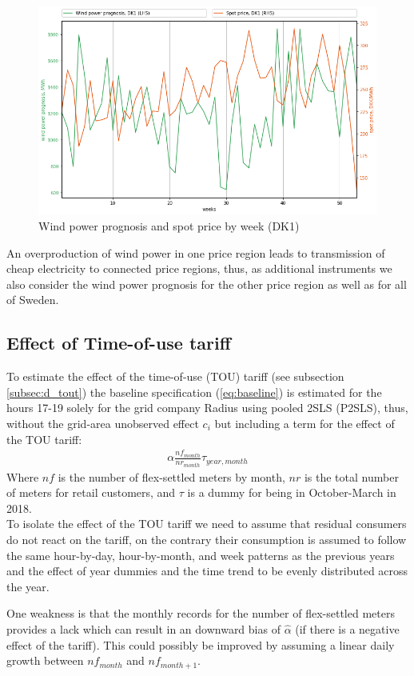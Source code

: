 \begin{figure}[H]
  \centering
  \caption{Wind power prognosis and spot price by week (DK1)}
  \label{fig:wp_price_dk1_week}
    \includegraphics[width=1 \textwidth]{03_figures/wp_DK1_weeks}
\end{figure}
\noindent
An overproduction of wind power in one price region leads to transmission of cheap electricity to connected price regions, thus, as additional instruments we also consider the wind power prognosis for the other price region as well as for all of Sweden.

\subsection{Effect of Time-of-use tariff}
\label{subsec:e_tout}
To estimate the effect of the time-of-use (TOU) tariff (see subsection \ref{subsec:d_tout}) the baseline specification (\ref{eq:baseline}) is estimated for the hours 17-19 solely for the grid company Radius using pooled 2SLS (P2SLS), thus, without the grid-area unobserved effect $c_i$ but including a term for the effect of the TOU tariff:
\begin{align}
  \alpha\frac{nf_{month}}{nr_{month}}\tau_{year,month}
  \label{eq:tout}
\end{align}
Where $nf$ is the number of flex-settled meters by month, $nr$ is the total number of meters for retail customers, and $\tau$ is a dummy for being in October-March in 2018.
\medskip\\
To isolate the effect of the TOU tariff we need to assume that residual consumers do not react on the tariff, on the contrary their consumption is assumed to follow the same hour-by-day, hour-by-month, and week patterns as the previous years and the effect of year dummies and the time trend to be evenly distributed across the year.
\par
One weakness is that the monthly records for the number of flex-settled meters provides a lack which can result in an downward bias of $\widehat{\alpha}$ (if there is a negative effect of the tariff). This could possibly be improved by assuming a linear daily growth between $nf_{month}$ and $nf_{month+1}$.


